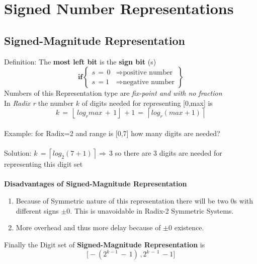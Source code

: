 \section{Signed Number Representations}
\subsection{Signed-Magnitude Representation}
Definition: The \textbf{most left bit} is the \textbf{sign bit} (s) \[
	\mathbf{if}
\left\{\begin{array}{cl}
	s\,=\,0 & \Longrightarrow \text{positive number}\\s\,=1 & \Longrightarrow \text{negative number} 
\end{array}\right\}
\]
Numbers of this Representation type are \textit{fix-point and with no fraction}\\
In \textit{Radix r} the number \(k\)  of digits needed for representing [0,max] is
\[
	k\,=\,\left\lfloor\,log_{r}max\,+\,1 \right\rfloor\,+1\,=\,\left\lceil log_{r}(max+1) \right\rceil 
\]
\\
Example: for Radix=2 and range is [0,7] how many digits are needed?
\\\\Solution: \(k\,=\left\lceil log_{2}(7+1) \right\rceil \Longrightarrow\, 3\) so there are 3 digits are needed for representing this digit set\\\\
\textbf{Disadvantages of Signed-Magnitude Representation}
\begin{enumerate}
	\item Because of Symmetric nature of this representation there will be two \(0\)s with different signs \(\pm0\). This is unavoidable in Radix-2 Symmetric Systems.
	\item More overhead and thus more delay because of \(\pm0\) existence.
\end{enumerate}
Finally the Digit set of \textbf{Signed-Magnitude Representation} is 
\[
	\big[-(2^{k-1}\,-\,1)\,,2^{k\,-\,1}\,-1\big]
\]